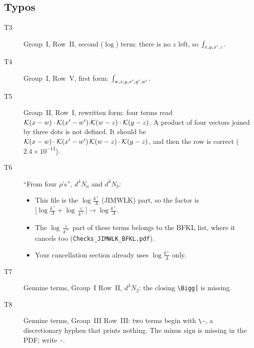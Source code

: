 \documentclass[10pt]{article}
\numberwithin{equation}{section}
\newcommand{\new}[1]{{\color{blue}#1}}
\newcommand{\old}[1]{{\color{red}#1}}
\begin{document}
\subsection{Typos}
\begin{description}
\item[T3] Group~I, Row~II, second ($\log$) term: there is no $z$ left, so $\int_{x,y,x'\old{,z}}$.
\item[T4] Group~I, Row~V, first form: $\int_{w,z,y,x',y'\new{,}w'}$.
\item[T5] Group~II, Row~I, rewritten form: four terms read $\mathcal K(x-w)\cdot\mathcal K(x'-w')\old{\cdot}\mathcal K(w-z)\cdot\mathcal K(y-z)$. A product of four vectors joined by three dots is not defined. It should be $\mathcal K(x-w)\cdot\mathcal K(x'-w')\new{\,}\mathcal K(w-z)\cdot\mathcal K(y-z)$, and then the row is correct ($2.4\times10^{-13}$).
\item[T6] ``From four $\rho$'s'', $d^3N_a$ and $d^3N_b$:
  \begin{itemize}
  \item This file is the $\log\frac{k^+}{\Lambda}$ (JIMWLK) part, so the factor is \old{$\big[\log\frac{k^+}{\Lambda}+\log\frac{\vee}{k^+}\big]$}$\to$\new{$\log\frac{k^+}{\Lambda}$}.
  \item The $\log\frac{\vee}{k^+}$ part of these terms belongs to the BFKL list, where it cancels too (\texttt{Checks\_JIMWLK\_BFKL.pdf}).
  \item Your cancellation section already uses $\log\frac{k^+}{\Lambda}$ only.
  \end{itemize}
\item[T7] Genuine terms, Group~I Row~II, $d^3N_2$: the closing \texttt{\textbackslash Bigg]} is missing.
\item[T8] Genuine terms, Group~III Row~III: two terms begin with \texttt{\textbackslash-}, a discretionary hyphen that prints nothing. The minus sign is missing in the PDF; write \texttt{-}.
\end{description}
\end{document}
